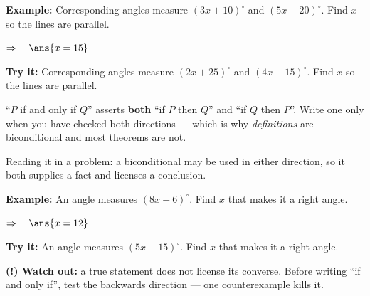 \documentclass[12pt]{article}
\begin{document}
\begin{examplebox}
\textbf{Example:} \quad Corresponding angles measure $(3x + 10)^\circ$ and $(5x - 20)^\circ$. Find $x$ so the lines are parallel.

$\Rightarrow\quad \ans{x = 15}$
\end{examplebox}

\begin{tryitbox}
\textbf{Try it:} \quad Corresponding angles measure $(2x + 25)^\circ$ and $(4x - 15)^\circ$. Find $x$ so the lines are parallel.\\[2pt]
\end{tryitbox}


\begin{formulabox}
``$P$ if and only if $Q$'' asserts \textbf{both} ``if $P$ then $Q$'' and ``if $Q$ then $P$''. Write one only when you have checked both directions --- which is why \emph{definitions} are biconditional and most theorems are not.\par
Reading it in a problem: a biconditional may be used in either direction, so it both supplies a fact and licenses a conclusion.
\end{formulabox}

\begin{examplebox}
\textbf{Example:} \quad An angle measures $(8x - 6)^\circ$. Find $x$ that makes it a right angle.

$\Rightarrow\quad \ans{x = 12}$
\end{examplebox}

\begin{tryitbox}
\textbf{Try it:} \quad An angle measures $(5x + 15)^\circ$. Find $x$ that makes it a right angle.\\[2pt]
\end{tryitbox}

\begin{watchoutbox}
\textbf{(!) Watch out:} a true statement does not license its converse. Before writing ``if and only if'', test the backwards direction --- one counterexample kills it.
\end{watchoutbox}
\end{document}
